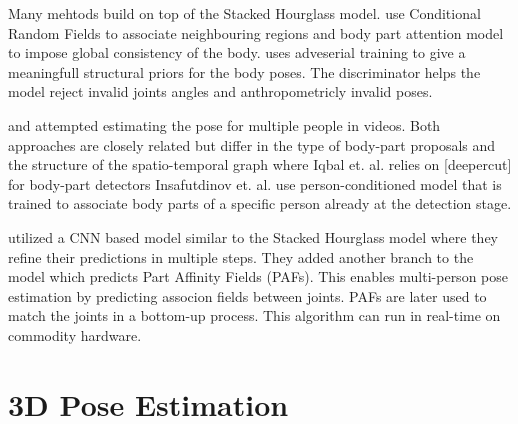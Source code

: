 Many mehtods build on top of the Stacked Hourglass model. \parencite{chu2017multi} use Conditional Random Fields to associate neighbouring regions and body part attention model to impose global consistency of the body. \parencite{chou2017self} uses adveserial training to give a meaningfull structural priors for the body poses. The discriminator helps the model reject invalid joints angles and anthropometricly invalid poses.

\parencite{iqbal2017posetrack} and \parencite{insafutdinov2017arttrack} attempted estimating the pose for multiple people in  videos. Both approaches are closely related but differ in the type of body-part proposals and the structure of the spatio-temporal graph where Iqbal et. al. relies on [deepercut] for body-part detectors Insafutdinov et. al. use person-conditioned model that is trained to associate body parts of a specific person already at the detection stage. 

\parencite{cao2016realtime} utilized a CNN based model similar to the Stacked Hourglass model where they refine their predictions in multiple steps. They added another branch to the model which predicts Part Affinity Fields (PAFs). This enables multi-person pose estimation by predicting associon fields between joints. PAFs are later used to match the joints in a bottom-up process. This algorithm can run in real-time on commodity hardware.

\section{3D Pose Estimation}

